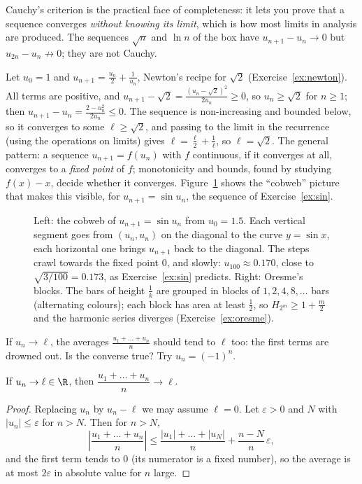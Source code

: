 Cauchy's criterion is the practical face of completeness: it lets you prove that a sequence converges \emph{without knowing its limit}, which is how
most limits in analysis are produced. The sequences $\sqrt n$ and $\ln n$ of the box have $u_{n+1}-u_n\to0$ but $u_{2n}-u_n\not\to0$; they are not Cauchy.

\begin{examplex}
Let $u_0=1$ and $u_{n+1}=\frac{u_n}2+\frac1{u_n}$, Newton's recipe for $\sqrt2$ (Exercise~\ref{ex:newton}). All terms are positive, and
$u_{n+1}-\sqrt2=\frac{(u_n-\sqrt2)^2}{2u_n}\ge0$, so $u_n\ge\sqrt2$ for $n\ge1$; then $u_{n+1}-u_n=\frac{2-u_n^2}{2u_n}\le0$. The sequence is
non-increasing and bounded below, so it converges to some $\ell\ge\sqrt2$, and passing to the limit in the recurrence (using the operations on limits)
gives $\ell=\frac\ell2+\frac1\ell$, so $\ell=\sqrt2$. The general pattern: a sequence $u_{n+1}=f(u_n)$ with $f$ continuous, if it converges at all,
converges to a \emph{fixed point} of $f$; monotonicity and bounds, found by studying $f(x)-x$, decide whether it converges. Figure~\ref{fig:cobweb}
shows the ``cobweb'' picture that makes this visible, for $u_{n+1}=\sin u_n$, the sequence of Exercise~\ref{ex:sin}.
\end{examplex}

\begin{figure}[ht]
\centering
{}
\caption{Left: the cobweb of $u_{n+1}=\sin u_n$ from $u_0=1.5$. Each vertical segment goes from $(u_n,u_n)$ on the diagonal to the curve $y=\sin x$, each horizontal one brings $u_{n+1}$ back to the diagonal. The steps crawl towards the fixed point $0$, and slowly: $u_{100}\approx0.170$, close to $\sqrt{3/100}=0.173$, as Exercise~\ref{ex:sin} predicts. Right: Oresme's blocks. The bars of height $\frac1k$ are grouped in blocks of $1,2,4,8,\dots$ bars (alternating colours); each block has area at least $\frac12$, so $H_{2^m}\ge1+\frac m2$ and the harmonic series diverges (Exercise~\ref{ex:oresme}).}
\label{fig:cobweb}
\end{figure}

\begin{think}
If $u_n\to\ell$, the averages $\frac{u_1+\dots+u_n}n$ should tend to $\ell$ too: the first terms are drowned out. Is the converse true? Try $u_n=(-1)^n$.
\end{think}

\begin{theorem}\label{thm:cesaro}
If $u_n\to\ell\in\R$, then $\dfrac{u_1+\dots+u_n}n\to\ell$.
\end{theorem}
\begin{proof}
Replacing $u_n$ by $u_n-\ell$ we may assume $\ell=0$. Let $\varepsilon>0$ and $N$ with $|u_n|\le\varepsilon$ for $n>N$. Then for $n>N$,
\[
\left|\frac{u_1+\dots+u_n}n\right|\le\frac{|u_1|+\dots+|u_N|}n+\frac{n-N}n\,\varepsilon,
\]
and the first term tends to $0$ (its numerator is a fixed number), so the average is at most $2\varepsilon$ in absolute value for $n$ large.
\end{proof}

